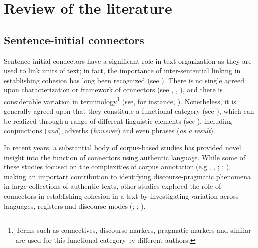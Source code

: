 \documentclass[output=paper]{langscibook}
\begin{document}
\section{
Review of the literature
}\label{sec:mikolic:3}

\subsection{Sentence-initial connectors}\label{sec:mikolic:3.1}

Sentence-initial connectors have a significant role in text organization as they are used to link units of text; in fact, the importance of inter-sentential linking in establishing cohesion has long been recognized (see \citealt{HallidayHasan1976}). There is no single agreed upon characterization or framework of connectors (see \citealt{HallidayHasan1976}, \citealt{VanDijk1977}, \citealt{Fraser1999}), and there is considerable variation in terminology\footnote{Terms such as connectives, discourse markers, pragmatic markers and similar are used for this functional category by different authors.} (see, for instance, \citealt[651]{CrawfordCamiciottoli2010}). Nonetheless, it is generally agreed upon that they constitute a functional category (see \citealt[30]{Becher2011connect}), which can be realized through a range of different linguistic elements (see \citealt[650]{CrawfordCamiciottoli2010}), including conjunctions (\textit{and}), adverbs (\textit{however}) and even phrases (\textit{as a result}). 

In recent years, a substantial body of corpus-based studies has provided novel insight into the function of connectors using authentic language. While some of these studies focused on the complexities of corpus annotation (e.g., \citealt{RehbeinEtAl2016}, \citealt{Crible2017,Crible2018, Crible2017, Crible2020}; \citealt{CribleCuenca2017}; \citealt{CriblePascual2020}), making an important contribution to identifying discourse-pragmatic phenomena in large collections of authentic texts, other studies explored the role of connectors in establishing cohesion in a text by investigating variation across languages, registers and discourse modes (\citealt{Lapshinova-KoltunskiKunz2014}; \citealt{KunzLapshinova-Koltunski2014,KunzLapshinova-Koltunski2015}; \citealt{Carrio-Pastor2013}).
\end{document}
